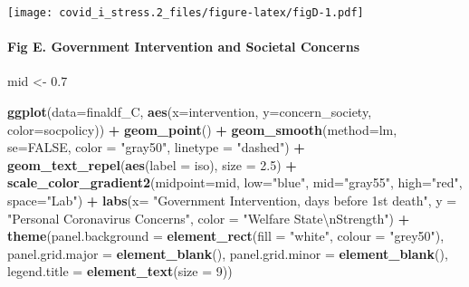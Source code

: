 \documentclass[
]{article}
\newenvironment{Shaded}{\begin{snugshade}}{\end{snugshade}}
\newcommand{\CharTok}[1]{\textcolor[rgb]{0.31,0.60,0.02}{#1}}
\newcommand{\DataTypeTok}[1]{\textcolor[rgb]{0.13,0.29,0.53}{#1}}
\newcommand{\DecValTok}[1]{\textcolor[rgb]{0.00,0.00,0.81}{#1}}
\newcommand{\FloatTok}[1]{\textcolor[rgb]{0.00,0.00,0.81}{#1}}
\newcommand{\KeywordTok}[1]{\textcolor[rgb]{0.13,0.29,0.53}{\textbf{#1}}}
\newcommand{\NormalTok}[1]{#1}
\newcommand{\OperatorTok}[1]{\textcolor[rgb]{0.81,0.36,0.00}{\textbf{#1}}}
\newcommand{\OtherTok}[1]{\textcolor[rgb]{0.56,0.35,0.01}{#1}}
\newcommand{\StringTok}[1]{\textcolor[rgb]{0.31,0.60,0.02}{#1}}
\begin{document}
\texttt{[image: covid\_i\_stress.2\_files/figure-latex/figD-1.pdf]}

\hypertarget{fig-e.-government-intervention-and-societal-concerns}{%
\paragraph{Fig E. Government Intervention and Societal
Concerns}\label{fig-e.-government-intervention-and-societal-concerns}}

\begin{Shaded}
\begin{Highlighting}[]
\NormalTok{mid <-}\StringTok{ }\FloatTok{0.7}

\KeywordTok{ggplot}\NormalTok{(}\DataTypeTok{data=}\NormalTok{finaldf_C, }\KeywordTok{aes}\NormalTok{(}\DataTypeTok{x=}\NormalTok{intervention, }\DataTypeTok{y=}\NormalTok{concern_society, }\DataTypeTok{color=}\NormalTok{socpolicy)) }\OperatorTok{+}
\StringTok{  }\KeywordTok{geom_point}\NormalTok{() }\OperatorTok{+}
\StringTok{  }\KeywordTok{geom_smooth}\NormalTok{(}\DataTypeTok{method=}\NormalTok{lm, }\DataTypeTok{se=}\OtherTok{FALSE}\NormalTok{, }\DataTypeTok{color =} \StringTok{"gray50"}\NormalTok{, }\DataTypeTok{linetype =} \StringTok{"dashed"}\NormalTok{) }\OperatorTok{+}
\StringTok{  }\KeywordTok{geom_text_repel}\NormalTok{(}\KeywordTok{aes}\NormalTok{(}\DataTypeTok{label =}\NormalTok{ iso), }\DataTypeTok{size =} \FloatTok{2.5}\NormalTok{) }\OperatorTok{+}
\StringTok{  }\KeywordTok{scale_color_gradient2}\NormalTok{(}\DataTypeTok{midpoint=}\NormalTok{mid, }\DataTypeTok{low=}\StringTok{"blue"}\NormalTok{, }\DataTypeTok{mid=}\StringTok{"gray55"}\NormalTok{, }\DataTypeTok{high=}\StringTok{"red"}\NormalTok{, }\DataTypeTok{space=}\StringTok{"Lab"}\NormalTok{) }\OperatorTok{+}
\StringTok{  }\KeywordTok{labs}\NormalTok{(}\DataTypeTok{x=} \StringTok{"Government Intervention, days before 1st death"}\NormalTok{, }\DataTypeTok{y =} \StringTok{"Personal Coronavirus Concerns"}\NormalTok{, }\DataTypeTok{color =} \StringTok{"Welfare State}\CharTok{\textbackslash{}n}\StringTok{Strength"}\NormalTok{) }\OperatorTok{+}
\StringTok{      }\KeywordTok{theme}\NormalTok{(}\DataTypeTok{panel.background =} \KeywordTok{element_rect}\NormalTok{(}\DataTypeTok{fill =} \StringTok{"white"}\NormalTok{, }\DataTypeTok{colour =} \StringTok{"grey50"}\NormalTok{),}
        \DataTypeTok{panel.grid.major =} \KeywordTok{element_blank}\NormalTok{(),}
        \DataTypeTok{panel.grid.minor =} \KeywordTok{element_blank}\NormalTok{(),}
        \DataTypeTok{legend.title =} \KeywordTok{element_text}\NormalTok{(}\DataTypeTok{size =} \DecValTok{9}\NormalTok{))}
\end{Highlighting}
\end{Shaded}
\end{document}

